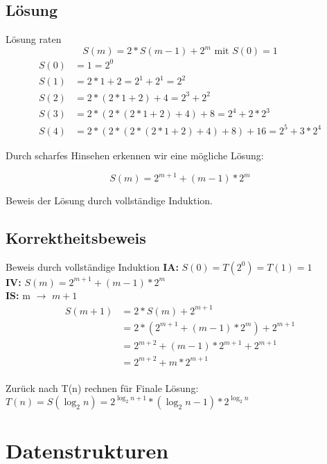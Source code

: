 \documentclass[18pt]{beamer}
\begin{document}
\subsection{Lösung}
\begin{frame}{Lösung raten}
	\[
		S(m) = 2 * S(m-1) + 2^m \text{ mit } S(0) = 1
	\]
	\begin{align*}
		S(0) &= 1 = 2^0\\
		S(1) &= 2 * 1 + 2 = 2^1 + 2^1 = 2^2\\
		S(2) &= 2 * (2 * 1 + 2) + 4 = 2^3 + 2^2\\
		S(3) &= 2 * (2 * (2 * 1 + 2) + 4 ) + 8 = 2^4 + 2 * 2^3\\
		S(4) &= 2 * ( 2 * (2 * (2 * 1 + 2) + 4 ) + 8 ) + 16 = 2^5 + 3 * 2^4
	\end{align*}

	Durch scharfes Hinsehen erkennen wir eine mögliche Lösung:

	$$S(m) = 2^{m+1} + (m-1) * 2^{m}$$

	Beweis der Lösung durch vollständige Induktion.
\end{frame}

\subsection{Korrektheitsbeweis}
\begin{frame}{Beweis durch vollständige Induktion}
	\textbf{IA:} $S(0) = T(2^0) = T(1) = 1$ \\
	\textbf{IV:} $S(m) = 2^{m+1} + (m - 1)*2^{m}$\\
	\textbf{IS:} m $\rightarrow$ $m+1$
	\begin{align}
		S(m+1)& = 2 * S(m) + 2^{m+1} \\
		& = 2 * ( 2^{m+1} + (m-1) * 2^m) + 2^{m+1} \\
		& = 2^{m+2} + (m-1) * 2^{m+1} + 2^{m+1} \\
		& = 2^{m+2} + m * 2^{m+1}
	\end{align}
	\ \\
	Zurück nach T(n) rechnen für Finale Lösung: \\
	$T(n) = S(\log _2 n) = 2^{\log _2 n + 1} * (\log _2 n - 1) * 2 ^{\log _2 n}$
\end{frame}

\section{Datenstrukturen}
\end{document}
